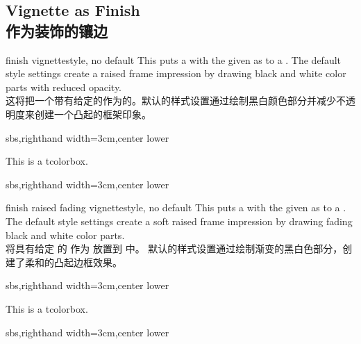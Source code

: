 \subsection{Vignette as Finish\\作为装饰的镶边}\label{subsec:vignettefinish}

\begin{docTcbKey}[][doc new=2016-04-22]{finish vignette}{}{style, no default}
This puts a  with the given 
as  to a .
The default style settings create a raised frame impression by
drawing black and white color parts with reduced opacity.
\\这将把一个带有给定的作为的。默认的样式设置通过绘制黑白颜色部分并减少不透明度来创建一个凸起的框架印象。

\begin{dispExample*}{sbs,righthand width=3cm,center lower}
\begin{tcolorbox}[enhanced,size=small,
colback=green!10,colframe=green!50!black,
boxrule=0.5mm,titlerule=0mm,
title=My title,center title,fonttitle=\bfseries,
finish vignette={size=1mm}]
  This is a tcolorbox.
\end{tcolorbox}
\end{dispExample*}

\begin{dispExample*}{sbs,righthand width=3cm,center lower}
\end{dispExample*}
\end{docTcbKey}


\begin{docTcbKey}[][doc new=2016-04-22]{finish raised fading vignette}{}{style, no default}
This puts a  with the given 
as  to a .
The default style settings create a soft raised frame impression by
drawing fading black and white color parts.
\\将具有给定  的  作为  放置到  中。 默认的样式设置通过绘制渐变的黑白色部分，创建了柔和的凸起边框效果。

\begin{dispExample*}{sbs,righthand width=3cm,center lower}
\begin{tcolorbox}[enhanced,size=small,
colback=green!10,colframe=green!50!black,
boxrule=0.5mm,titlerule=0mm,
title=My title,center title,fonttitle=\bfseries,
finish raised fading vignette={size=1mm}]
  This is a tcolorbox.
\end{tcolorbox}
\end{dispExample*}

\begin{dispExample*}{sbs,righthand width=3cm,center lower}
\end{dispExample*}

\end{docTcbKey}


